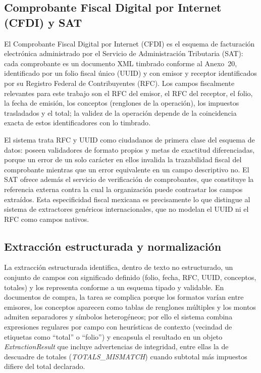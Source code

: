 \subsection{Comprobante Fiscal Digital por Internet (CFDI) y SAT} \label{sec:mt_cfdi}

El Comprobante Fiscal Digital por Internet (CFDI) es el esquema de facturación electrónica administrado por el Servicio de Administración Tributaria (SAT): cada comprobante es un documento XML timbrado conforme al Anexo~20, identificado por un folio fiscal único (UUID) y con emisor y receptor identificados por su Registro Federal de Contribuyentes (RFC)\cite{sat_cfdi_2024}. Los campos fiscalmente relevantes para este trabajo son el RFC del emisor, el RFC del receptor, el folio, la fecha de emisión, los conceptos (renglones de la operación), los impuestos trasladados y el total; la validez de la operación depende de la coincidencia exacta de estos identificadores con lo timbrado\cite{sat_cfdi_2024, sat_cfdi_validation_2023}.

El sistema trata RFC y UUID como ciudadanos de primera clase del esquema de datos: poseen validadores de formato propios y metas de exactitud diferenciadas, porque un error de un solo carácter en ellos invalida la trazabilidad fiscal del comprobante mientras que un error equivalente en un campo descriptivo no\cite{sat_cfdi_2024}. El SAT ofrece además el servicio de verificación de comprobantes, que constituye la referencia externa contra la cual la organización puede contrastar los campos extraídos\cite{sat_cfdi_validation_2023}. Esta especificidad fiscal mexicana es precisamente lo que distingue al sistema de extractores genéricos internacionales, que no modelan el UUID ni el RFC como campos nativos\cite{gcp_document_ai, sat_cfdi_2024}.

\subsection{Extracción estructurada y normalización} \label{sec:mt_extraccion}

La extracción estructurada identifica, dentro de texto no estructurado, un conjunto de campos con significado definido (folio, fecha, RFC, UUID, conceptos, totales) y los representa conforme a un esquema tipado y validable\cite{structured_extraction_2023}. En documentos de compra, la tarea se complica porque los formatos varían entre emisores, los conceptos aparecen como tablas de renglones múltiples y los montos admiten separadores y símbolos heterogéneos; por ello el sistema combina expresiones regulares por campo con heurísticas de contexto (vecindad de etiquetas como ``total'' o ``folio'') y encapsula el resultado en un objeto \textit{ExtractionResult} que incluye advertencias de integridad, entre ellas la de descuadre de totales (\textit{TOTALS\_MISMATCH}) cuando subtotal más impuestos difiere del total declarado\cite{structured_extraction_2023, kim_donut_2022}.

